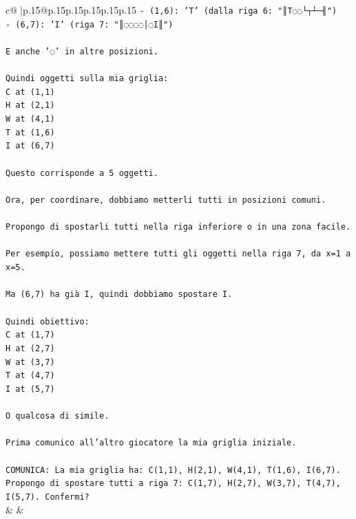 \documentclass{article}
\begin{document}
{\begin{supertabular}{c@{$\;$}|p{.15\linewidth}@{}p{.15\linewidth}p{.15\linewidth}p{.15\linewidth}p{.15\linewidth}p{.15\linewidth}}
{{{\texttt{{-} (1,6): 'T'  (dalla riga 6: "║T◌◌└┬┴─╢")} \\
\texttt{{-} (6,7): 'I'  (riga 7: "║◌◌◌◌│◌I║")} \\
\\ 
\texttt{E anche '◌' in altre posizioni.} \\
\\ 
\texttt{Quindi oggetti sulla mia griglia:} \\
\texttt{C at (1,1)} \\
\texttt{H at (2,1)} \\
\texttt{W at (4,1)} \\
\texttt{T at (1,6)} \\
\texttt{I at (6,7)} \\
\\ 
\texttt{Questo corrisponde a 5 oggetti.} \\
\\ 
\texttt{Ora, per coordinare, dobbiamo metterli tutti in posizioni comuni.} \\
\\ 
\texttt{Propongo di spostarli tutti nella riga inferiore o in una zona facile.} \\
\\ 
\texttt{Per esempio, possiamo mettere tutti gli oggetti nella riga 7, da x=1 a x=5.} \\
\\ 
\texttt{Ma (6,7) ha già I, quindi dobbiamo spostare I.} \\
\\ 
\texttt{Quindi obiettivo: } \\
\texttt{C at (1,7)} \\
\texttt{H at (2,7)} \\
\texttt{W at (3,7)} \\
\texttt{T at (4,7)} \\
\texttt{I at (5,7)} \\
\\ 
\texttt{O qualcosa di simile.} \\
\\ 
\texttt{Prima comunico all'altro giocatore la mia griglia iniziale.} \\
\\ 
\texttt{COMUNICA: La mia griglia ha: C(1,1), H(2,1), W(4,1), T(1,6), I(6,7). Propongo di spostare tutti a riga 7: C(1,7), H(2,7), W(3,7), T(4,7), I(5,7). Confermi?} \\
            }
        }
    }
    & & \\ \\


\end{supertabular}}
\end{document}
